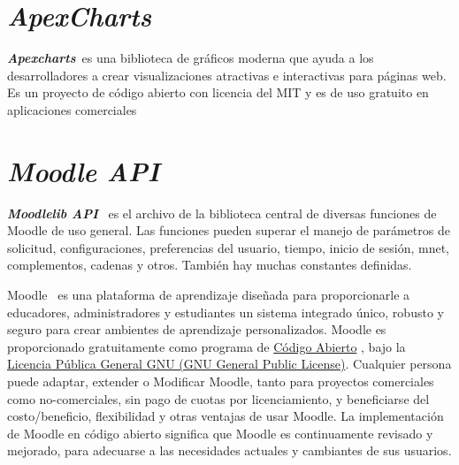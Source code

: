 \section{\textit{ApexCharts}}
\textbf{\textit{Apexcharts}}~\cite{ApexChart}es una biblioteca de gráficos moderna que ayuda a los desarrolladores a crear visualizaciones atractivas e interactivas para páginas web.
Es un proyecto de código abierto con licencia del MIT y es de uso gratuito en aplicaciones comerciales

\section{\textit{Moodle API}}
\textbf{\textit{Moodlelib API}}~\cite{MoodleAPI} es el archivo de la biblioteca central de diversas funciones de Moodle de uso general. Las funciones pueden superar el manejo de parámetros de solicitud, configuraciones, preferencias del usuario, tiempo, inicio de sesión, mnet, complementos, cadenas y otros. También hay muchas constantes definidas.

Moodle~\cite{Moodle} es una plataforma de aprendizaje diseñada para proporcionarle a educadores, administradores y estudiantes un sistema integrado único, robusto y seguro para crear ambientes de aprendizaje personalizados. 
Moodle es proporcionado gratuitamente como programa de \href{https://opensource.org/docs/osd}{Código Abierto} , bajo la \href{https://docs.moodle.org/dev/License}{Licencia Pública General GNU (GNU General Public License)}. Cualquier persona puede adaptar, extender o Modificar Moodle, tanto para proyectos comerciales como no-comerciales, sin pago de cuotas por licenciamiento, y beneficiarse del costo/beneficio, flexibilidad y otras ventajas de usar Moodle. La implementación de Moodle en código abierto significa que Moodle es continuamente revisado y mejorado, para adecuarse a las necesidades actuales y cambiantes de sus usuarios.


